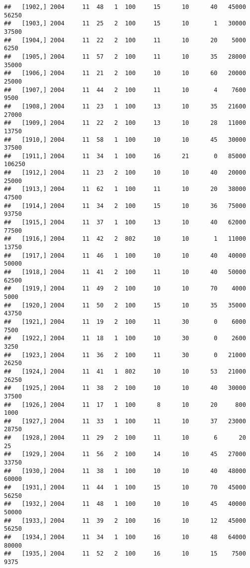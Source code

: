 \documentclass{article}\usepackage[]{graphicx}\usepackage[]{color}
\makeatletter
\newenvironment{kframe}{%
 \def\at@end@of@kframe{}%
 \ifinner\ifhmode%
  \def\at@end@of@kframe{\end{minipage}}%
  \begin{minipage}{\columnwidth}%
 \fi\fi%
 \def\FrameCommand##1{\hskip\@totalleftmargin \hskip-\fboxsep
 \colorbox{shadecolor}{##1}\hskip-\fboxsep
     \hskip-\linewidth \hskip-\@totalleftmargin \hskip\columnwidth}%
 \MakeFramed {\advance\hsize-\width
   \@totalleftmargin\z@ \linewidth\hsize
   \@setminipage}}%
 {\par\unskip\endMakeFramed%
 \at@end@of@kframe}
\newenvironment{knitrout}{}{} %
\makeatother
\begin{document}
\begin{knitrout}
\begin{kframe}
\begin{verbatim}
##   [1902,] 2004     11  48   1  100     15      10      40   45000   56250
##   [1903,] 2004     11  25   2  100     15      10       1   30000   37500
##   [1904,] 2004     11  22   2  100     11      10      20    5000    6250
##   [1905,] 2004     11  57   2  100     11      10      35   28000   35000
##   [1906,] 2004     11  21   2  100     10      10      60   20000   25000
##   [1907,] 2004     11  44   2  100     11      10       4    7600    9500
##   [1908,] 2004     11  23   1  100     13      10      35   21600   27000
##   [1909,] 2004     11  22   2  100     13      10      28   11000   13750
##   [1910,] 2004     11  58   1  100     10      10      45   30000   37500
##   [1911,] 2004     11  34   1  100     16      21       0   85000  106250
##   [1912,] 2004     11  23   2  100     10      10      40   20000   25000
##   [1913,] 2004     11  62   1  100     11      10      20   38000   47500
##   [1914,] 2004     11  34   2  100     15      10      36   75000   93750
##   [1915,] 2004     11  37   1  100     13      10      40   62000   77500
##   [1916,] 2004     11  42   2  802     10      10       1   11000   13750
##   [1917,] 2004     11  46   1  100     10      10      40   40000   50000
##   [1918,] 2004     11  41   2  100     11      10      40   50000   62500
##   [1919,] 2004     11  49   2  100     10      10      70    4000    5000
##   [1920,] 2004     11  50   2  100     15      10      35   35000   43750
##   [1921,] 2004     11  19   2  100     11      30       0    6000    7500
##   [1922,] 2004     11  18   1  100     10      30       0    2600    3250
##   [1923,] 2004     11  36   2  100     11      30       0   21000   26250
##   [1924,] 2004     11  41   1  802     10      10      53   21000   26250
##   [1925,] 2004     11  38   2  100     10      10      40   30000   37500
##   [1926,] 2004     11  17   1  100      8      10      20     800    1000
##   [1927,] 2004     11  33   1  100     11      10      37   23000   28750
##   [1928,] 2004     11  29   2  100     11      10       6      20      25
##   [1929,] 2004     11  56   2  100     14      10      45   27000   33750
##   [1930,] 2004     11  38   1  100     10      10      40   48000   60000
##   [1931,] 2004     11  44   1  100     15      10      70   45000   56250
##   [1932,] 2004     11  48   1  100     10      10      45   40000   50000
##   [1933,] 2004     11  39   2  100     16      10      12   45000   56250
##   [1934,] 2004     11  34   1  100     16      10      48   64000   80000
##   [1935,] 2004     11  52   2  100     16      10      15    7500    9375

\end{verbatim}
\end{kframe}
\end{knitrout}
\end{document}
